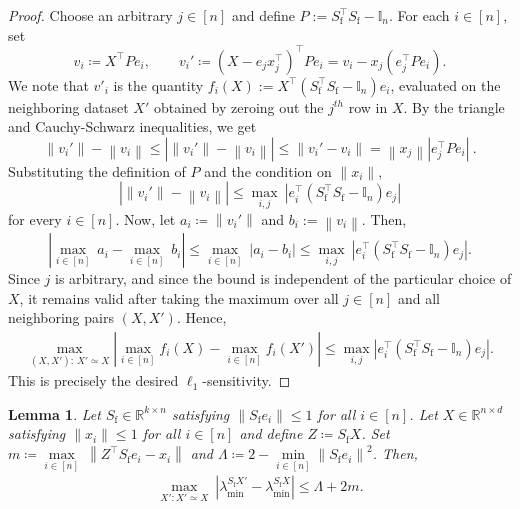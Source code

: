 \documentclass[11pt]{article}
\newtheorem{lem}{Lemma}
\theoremstyle{definition}
\theoremstyle{plain}
\providecommand{\brI}{\mathbb{I}}
\newcommand{\abs}[1]{\left| #1 \right|}
\newcommand{\Norm}[1]{\left\| #1 \right\|}
\providecommand{\norm}[1]{\Norm{#1}}
\begin{document}
\begin{proof}
Choose an arbitrary $j\in[n]$ and define $P:=S_{\mathrm{f}}^\top S_{\mathrm{f}} - \brI_n$. For each $i\in[n]$, set
\begin{equation}
    v_i\coloneq X^\top P e_i,\qquad
    v_i'\coloneq \left(X - e_j x_j^\top\right)^\top P e_i = v_i - x_j\left(e_j^{\top} P e_i\right).
\end{equation}
We note that $v'_i$ is the quantity $f_i(X) := X^{\top}(S_{\mathrm{f}}^{\top}S_{\mathrm{f}} - \brI_n)e_i$, evaluated on the neighboring dataset $X'$ obtained by zeroing out the \(j^{th}\) row in $X$.
By the triangle and Cauchy-Schwarz inequalities, we get 
\begin{equation}
    \norm{v_i'}-\norm{v_i} \leq \abs{\norm{v_i'}-\norm{v_i}} \leq \norm{v_i' - v_i} = \norm{x_j}\abs{e_j^\top P e_i}~.
\end{equation}
Substituting the definition of \(P\) and the condition on \(\|x_{i}\|\),
\begin{equation}
    \abs{\norm{v_i'} - \norm{v_i}}\le \underset{i, j}{\max} \ \abs{e^{\top}_i\left(S_{\mathrm{f}}^{\top}S_{\mathrm{f}} - \brI_n\right)e_j}
\end{equation}
for every $i\in [n]$. Now, let $a_i\coloneq \norm{v_i'}$ and $b_i:=\norm{v_i}$. 
Then,
\begin{equation}
    \abs{\underset{i\in [n]}{\max} \ a_i - \underset{i\in [n]}{\max} \ b_i} \le \underset{i\in [n]}{\max} \ \abs{a_i - b_i} \le \underset{i, j}{\max} \ \abs{e^{\top}_i\left(S_{\mathrm{f}}^{\top}S_{\mathrm{f}} - \brI_n\right)e_j}.
\end{equation}
Since \(j\) is arbitrary, and since the bound is independent of the particular choice of \(X\), it remains valid after taking the maximum over all \(j\in[n]\) and all neighboring pairs \((X,X')\). Hence,
\begin{align}
    \max_{(X,X'):\,X'\simeq X}\left|\max_{i\in[n]} f_i(X)-\max_{i\in[n]} f_i(X')\right|
    \leq
    \max_{i,j}\left|e_i^{\top}\!\left(S_{\mathrm{f}}^{\top}S_{\mathrm{f}}-\brI_n\right)e_j\right|.
\end{align}
This is precisely the desired \(\ell_1\)-sensitivity.
\end{proof}

\bigskip 

\begin{lem}
\label{lem:sensitivity_F_eigenvalues}
Let $S_{\mathrm{f}}\in\mathbb{R}^{k\times n}$ satisfying $\|S_{\mathrm{f}}e_i\| \leq 1$ for all $i\in[n]$. Let $X\in\mathbb{R}^{n\times d}$ satisfying $\|x_i\|\le 1$ for all $i\in[n]$ and define $Z\coloneq S_{\mathrm{f}}X$. Set $m\coloneq \underset{i\in [n]}{\max} \ \norm{Z^{\top}S_{\mathrm{f}}e_i - x_i}$ and $\Lambda\coloneq 2 - \underset{i\in[n]}{\min} \norm{S_{\mathrm{f}}e_i}^2$. Then, 
\begin{align}
    \underset{X': X'\simeq X}{\max} \ \abs{\lambda^{S_{\mathrm{f}}X'}_{\min} - \lambda^{S_{\mathrm{f}}X}_{\min}} \leq \Lambda + 2m.
\end{align}
\end{lem}
\end{document}
